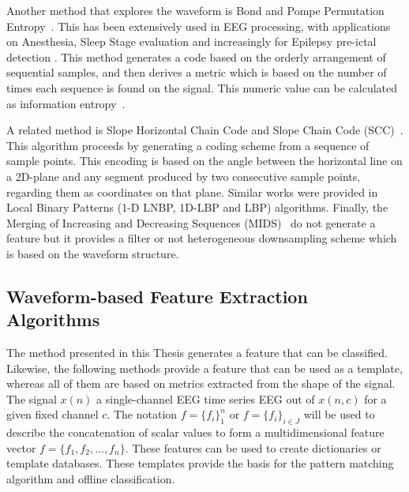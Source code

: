 Another method that explores the waveform is Bond and Pompe Permutation Entropy~\cite{Bandt2002}.  This has been extensively used in EEG processing, with applications on Anesthesia, Sleep Stage evaluation and increasingly for Epilepsy pre-ictal detection .  This method generates a code based on the orderly arrangement of sequential samples, and then derives a metric which is based on the number of times each sequence is found on the signal.  This numeric value can be calculated as information entropy~\cite{Nicolaou2010}.

A related method is Slope Horizontal Chain Code and Slope Chain Code (SCC)~\cite{Alvarado-Gonzalez2016}. This algorithm proceeds by generating a coding scheme from a sequence of sample points. This encoding is based on the angle between the horizontal line on a 2D-plane and any segment produced by two consecutive sample points, regarding them as coordinates on that plane.  Similar works were provided in Local Binary Patterns  (1-D LNBP, 1D-LBP and LBP)\cite{Jaiswal2017} algorithms.  Finally, the  Merging of Increasing and Decreasing Sequences (MIDS)~\cite{Zhang2013} do not generate a feature but it provides a filter or not heterogeneous downsampling scheme which is based on the waveform structure.

%

\subsection{Waveform-based Feature Extraction Algorithms}

The method presented in this Thesis generates a feature that can be classified.  Likewise, the following methods provide a feature that can be used as a template, whereas all of them are based on metrics extracted from the shape of the signal.  The signal $x(n)$ a single-channel EEG time series EEG out of $x(n,c)$ for a given fixed channel $c$.  The notation $f=\{f_i\}_{1}^{n} $ or $f=\{f_i\}_{i \in J}^{} $  will be used to describe the concatenation of scalar values to form a multidimensional feature vector $f=\{f_1,f_2,...,f_n\}$. These features can be used to create dictionaries or template databases.  These templates provide the basis for the pattern matching algorithm and offline classification. 

